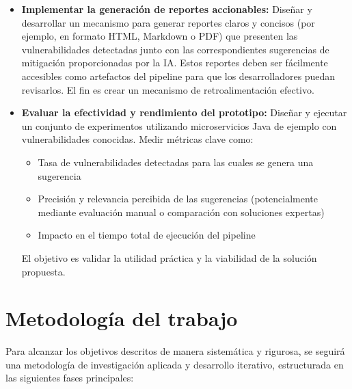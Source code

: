 \begin{itemize}
    \item \textbf{Implementar la generación de reportes accionables:} Diseñar y desarrollar un mecanismo para generar reportes claros y concisos (por ejemplo, en formato HTML, Markdown o PDF) que presenten las vulnerabilidades detectadas junto con las correspondientes sugerencias de mitigación proporcionadas por la IA. Estos reportes deben ser fácilmente accesibles como artefactos del pipeline para que los desarrolladores puedan revisarlos. El fin es crear un mecanismo de retroalimentación efectivo.
    
    \item \textbf{Evaluar la efectividad y rendimiento del prototipo:} Diseñar y ejecutar un conjunto de experimentos utilizando microservicios Java de ejemplo con vulnerabilidades conocidas. Medir métricas clave como:
    \begin{itemize}
        \item Tasa de vulnerabilidades detectadas para las cuales se genera una sugerencia
        \item Precisión y relevancia percibida de las sugerencias (potencialmente mediante evaluación manual o comparación con soluciones expertas)
        \item Impacto en el tiempo total de ejecución del pipeline
    \end{itemize}
    El objetivo es validar la utilidad práctica y la viabilidad de la solución propuesta.
\end{itemize}

\section{Metodología del trabajo}\label{sec:metodologia_trabajo}

Para alcanzar los objetivos descritos de manera sistemática y rigurosa, se seguirá una metodología de investigación aplicada y desarrollo iterativo, estructurada en las siguientes fases principales:

